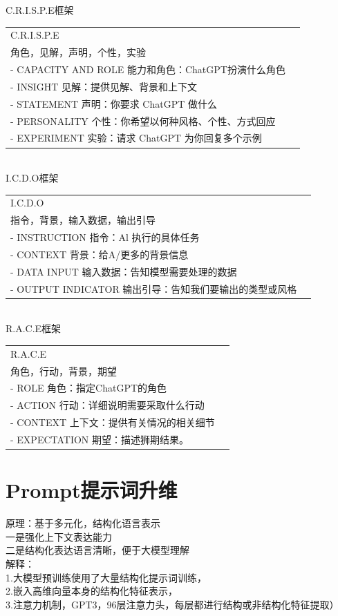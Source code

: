 \documentclass[12pt]{book}
\begin{document}
 C.R.I.S.P.E框架\\
	\begin{tabular}{|p{16cm}|p{3cm}|}
		\hline
		C.R.I.S.P.E \\
		角色，见解，声明，个性，实验 \\
		- CAPACITY AND ROLE 能力和角色：ChatGPT扮演什么角色 \\
		- INSIGHT 见解：提供见解、背景和上下文 \\
		- STATEMENT 声明：你要求 ChatGPT 做什么 \\
		- PERSONALITY 个性：你希望以何种风格、个性、方式回应 \\
		- EXPERIMENT 实验：请求 ChatGPT 为你回复多个示例 \\
		\hline
      \end{tabular}\\
	
	I.C.D.O框架\\
		\begin{tabular}{|p{16cm}|p{3cm}|}
	\hline
		I.C.D.O \\
		指令，背景，输入数据，输出引导 \\
		- INSTRUCTION 指令：Al 执行的具体任务 \\
		- CONTEXT 背景：给A/更多的背景信息 \\
		- DATA INPUT  输入数据：告知模型需要处理的数据 \\
		- OUTPUT INDICATOR 输出引导：告知我们要输出的类型或风格 \\
		\hline
\end{tabular}\\


R.A.C.E框架\\
\begin{tabular}{|p{16cm}|p{3cm}|}
	\hline
		R.A.C.E\\
		角色，行动，背景，期望\\
		- ROLE 角色：指定ChatGPT的角色\\
		- ACTION 行动：详细说明需要采取什么行动\\
		- CONTEXT 上下文：提供有关情况的相关细节\\
		- EXPECTATION 期望：描述狮期结果。\\
	\hline
\end{tabular}

	
	\section{Prompt提示词升维}
	原理：基于多元化，结构化语言表示\\
	一是强化上下文表达能力\\
	二是结构化表达语言清晰，便于大模型理解\\
	解释：\\
	1.大模型预训练使用了大量结构化提示词训练，\\
	2.嵌入高维向量本身的结构化特征表示，\\
	3.注意力机制，GPT3，96层注意力头，每层都进行结构或非结构化特征提取）
	
\end{document}
